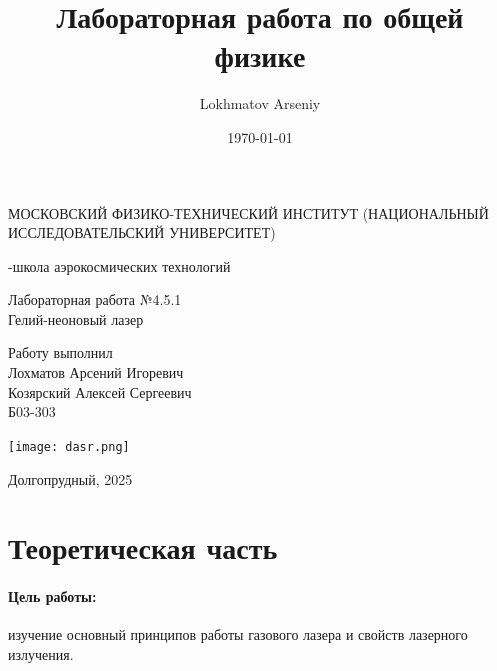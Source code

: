 \documentclass[a4paper,12pt]{article} %
\author{Lokhmatov Arseniy}
\title{Лабораторная работа по общей физике}
\date{\today}
\begin{document}
\begin{titlepage}
    \newpage
    \begin{center}
    {\large МОСКОВСКИЙ ФИЗИКО-ТЕХНИЧЕСКИЙ ИНСТИТУТ (НАЦИОНАЛЬНЫЙ ИССЛЕДОВАТЕЛЬСКИЙ УНИВЕРСИТЕТ)}
    \vspace{1cm}

    {-школа аэрокосмических технологий}
    \vspace{6em}
    \end{center}
    
    \vspace{1.2em}

    \begin{center}
    \Large Лабораторная работа №4.5.1 \\
    Гелий-неоновый лазер
    \linebreak
    \end{center}
    
    \vspace{11em}
    
    \begin{flushright}
                       {\large Работу выполнил\\
                       Лохматов Арсений Игоревич\\
                       Козярский Алексей Сергеевич\\
                       Б03-303 }
    \end{flushright}

    \vspace{\fill}

    \begin{center}
        \texttt{[image: dasr.png]}
    \end{center}

    \begin{center}
    Долгопрудный, 2025
    \end{center}

    \end{titlepage}

\section{Теоретическая часть}


\paragraph{Цель работы: } изучение основный принципов работы газового лазера и свойств лазерного излучения.
\end{document}
